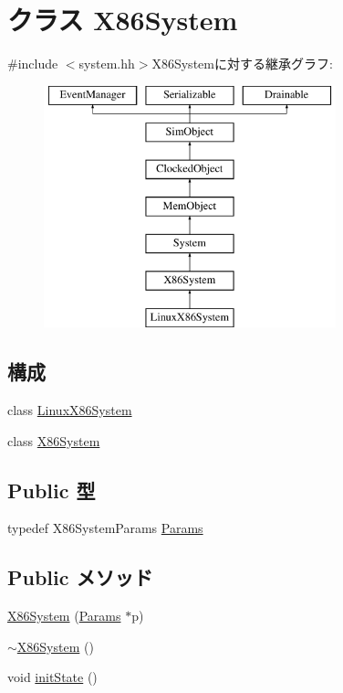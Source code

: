 \hypertarget{classX86System}{
\section{クラス X86System}
\label{classX86System}
}


{\ttfamily \#include $<$system.hh$>$}X86Systemに対する継承グラフ:\begin{figure}[H]
\begin{center}
\leavevmode
\includegraphics[height=7cm]{classX86System}
\end{center}
\end{figure}
\subsection*{構成}
\begin{DoxyCompactItemize}
\item 
class \hyperlink{classX86System_1_1LinuxX86System}{LinuxX86System}
\item 
class \hyperlink{classX86System_1_1X86System}{X86System}
\end{DoxyCompactItemize}
\subsection*{Public 型}
\begin{DoxyCompactItemize}
\item 
typedef X86SystemParams \hyperlink{classX86System_a4f3142e3ba81ac1e14e960636ad3202b}{Params}
\end{DoxyCompactItemize}
\subsection*{Public メソッド}
\begin{DoxyCompactItemize}
\item 
\hyperlink{classX86System_aa4f02fc2926ae35d549b6b5381b7656f}{X86System} (\hyperlink{classX86System_a4f3142e3ba81ac1e14e960636ad3202b}{Params} $\ast$p)
\item 
\hyperlink{classX86System_a0f8dc8b16330d4a51897190c3969e675}{$\sim$X86System} ()
\item 
void \hyperlink{classX86System_a3c34ea9b29f410748d4435a667484924}{initState} ()
\end{DoxyCompactItemize}
